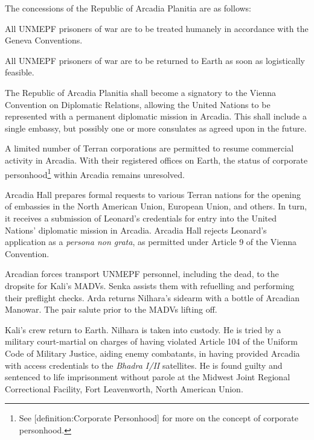 The concessions of the Republic of Arcadia Planitia are as follows:

\startitemize[R]
\item All UNMEPF prisoners of war are to be treated humanely in accordance with the Geneva Conventions.

\item All UNMEPF prisoners of war are to be returned to Earth as soon as logistically feasible.

\item The Republic of Arcadia Planitia shall become a signatory to the Vienna Convention on Diplomatic Relations, allowing the United Nations to be represented with a permanent diplomatic mission in Arcadia. This shall include a single embassy, but possibly one or more consulates as agreed upon in the future.

\item A limited number of Terran corporations are permitted to resume commercial activity in Arcadia. With their registered offices on Earth, the status of corporate personhood\footnote{See [definition:Corporate Personhood] for more on the concept of corporate personhood.} within Arcadia remains unresolved.
\stopitemize

Arcadia Hall prepares formal requests to various Terran nations for the opening of embassies in the North American Union, European Union, and others. In turn, it receives a submission of Leonard's credentials for entry into the United Nations' diplomatic mission in Arcadia. Arcadia Hall rejects Leonard's application as a {\it persona non grata}, as permitted under Article 9 of the Vienna Convention.
\StopTimelineDate

Arcadian forces transport UNMEPF personnel, including the dead, to the dropsite for Kali's MADVs. Senka assists them with refuelling and performing their preflight checks. Arda returns Nilhara's sidearm with a bottle of Arcadian Manowar. The pair salute prior to the MADVs lifting off.
\StopTimelineDate

Kali's crew return to Earth. Nilhara is taken into custody. He is tried by a military court-martial on charges of having violated Article 104 of the Uniform Code of Military Justice, aiding enemy combatants, in having provided Arcadia with access credentials to the {\it Bhadra I/II} satellites. He is found guilty and sentenced to life imprisonment without parole at the Midwest Joint Regional Correctional Facility, Fort Leavenworth, North American Union.
\StopTimelineDate

